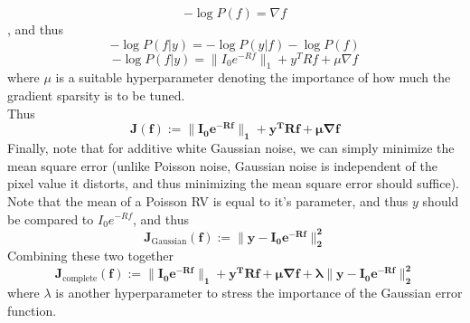 \documentclass[a4paper,14pt]{article}
\numberwithin{definition}{section}
\numberwithin{mytheorem}{subsection}
\begin{document}
$$-\log P(f) = \nabla f$$, and thus
$$-\log P(f|y) = -\log P(y|f) -\log P(f)$$
$$-\log P(f|y) = \lVert I_0e^{-Rf}\rVert_1 + y^TRf + \mu\nabla f$$
where $\mu$ is a suitable hyperparameter denoting the importance of how much the gradient sparsity is to be tuned.\\
Thus
$$\boldsymbol{J(f) := \lVert I_0e^{-Rf}\rVert_1 + y^TRf + \mu\nabla f}$$
Finally, note that for additive white Gaussian noise, we can simply minimize the mean square error (unlike Poisson noise, Gaussian noise is independent of the pixel value it distorts, and thus minimizing the mean square error should suffice). Note that the mean of a Poisson RV is equal to it's parameter, and thus $y$ should be compared to $I_0e^{-Rf}$, and thus 
$$\boldsymbol{J_{\mathrm{Gaussian}}(f) := \lVert y - I_0e^{-Rf}\rVert^2_2}$$
Combining these two together
$$\boldsymbol{J_{\mathrm{complete}}(f) := \lVert I_0e^{-Rf}\rVert_1 + y^TRf + \mu\nabla f + \lambda\lVert y - I_0e^{-Rf}\rVert^2_2}$$
where $\lambda$ is another hyperparameter to stress the importance of the Gaussian error function.
\end{document}
